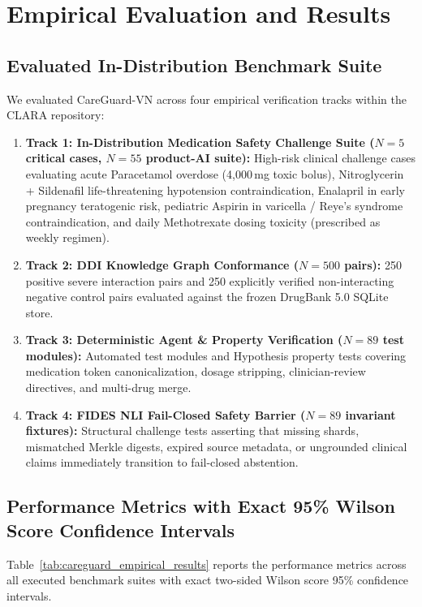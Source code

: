 \documentclass[11pt]{article}
\begin{document}
\section{Empirical Evaluation and Results}

\subsection{Evaluated In-Distribution Benchmark Suite}
We evaluated CareGuard-VN across four empirical verification tracks within the CLARA repository:
\begin{enumerate}[leftmargin=*]
  \item \textbf{Track 1: In-Distribution Medication Safety Challenge Suite ($N=5$ critical cases, $N=55$ product-AI suite):} High-risk clinical challenge cases evaluating acute Paracetamol overdose (4,000\,mg toxic bolus), Nitroglycerin + Sildenafil life-threatening hypotension contraindication, Enalapril in early pregnancy teratogenic risk, pediatric Aspirin in varicella / Reye's syndrome contraindication, and daily Methotrexate dosing toxicity (prescribed as weekly regimen).
  \item \textbf{Track 2: DDI Knowledge Graph Conformance ($N=500$ pairs):} 250 positive severe interaction pairs and 250 explicitly verified non-interacting negative control pairs evaluated against the frozen DrugBank 5.0 SQLite store.
  \item \textbf{Track 3: Deterministic Agent \& Property Verification ($N=89$ test modules):} Automated test modules and Hypothesis property tests covering medication token canonicalization, dosage stripping, clinician-review directives, and multi-drug merge.
  \item \textbf{Track 4: FIDES NLI Fail-Closed Safety Barrier ($N=89$ invariant fixtures):} Structural challenge tests asserting that missing shards, mismatched Merkle digests, expired source metadata, or ungrounded clinical claims immediately transition to fail-closed abstention.
\end{enumerate}

\subsection{Performance Metrics with Exact 95\% Wilson Score Confidence Intervals}
Table~\ref{tab:careguard_empirical_results} reports the performance metrics across all executed benchmark suites with exact two-sided Wilson score 95\% confidence intervals.
\end{document}
